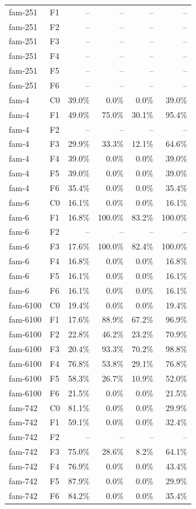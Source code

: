 \begin{tabular}{llrrrr}
fam-251 & F1 & -- & -- & -- & -- \\
fam-251 & F2 & -- & -- & -- & -- \\
fam-251 & F3 & -- & -- & -- & -- \\
fam-251 & F4 & -- & -- & -- & -- \\
fam-251 & F5 & -- & -- & -- & -- \\
fam-251 & F6 & -- & -- & -- & -- \\
fam-4 & C0 & 39.0\% & 0.0\% & 0.0\% & 39.0\% \\
fam-4 & F1 & 49.0\% & 75.0\% & 30.1\% & 95.4\% \\
fam-4 & F2 & -- & -- & -- & -- \\
fam-4 & F3 & 29.9\% & 33.3\% & 12.1\% & 64.6\% \\
fam-4 & F4 & 39.0\% & 0.0\% & 0.0\% & 39.0\% \\
fam-4 & F5 & 39.0\% & 0.0\% & 0.0\% & 39.0\% \\
fam-4 & F6 & 35.4\% & 0.0\% & 0.0\% & 35.4\% \\
fam-6 & C0 & 16.1\% & 0.0\% & 0.0\% & 16.1\% \\
fam-6 & F1 & 16.8\% & 100.0\% & 83.2\% & 100.0\% \\
fam-6 & F2 & -- & -- & -- & -- \\
fam-6 & F3 & 17.6\% & 100.0\% & 82.4\% & 100.0\% \\
fam-6 & F4 & 16.8\% & 0.0\% & 0.0\% & 16.8\% \\
fam-6 & F5 & 16.1\% & 0.0\% & 0.0\% & 16.1\% \\
fam-6 & F6 & 16.1\% & 0.0\% & 0.0\% & 16.1\% \\
fam-6100 & C0 & 19.4\% & 0.0\% & 0.0\% & 19.4\% \\
fam-6100 & F1 & 17.6\% & 88.9\% & 67.2\% & 96.9\% \\
fam-6100 & F2 & 22.8\% & 46.2\% & 23.2\% & 70.9\% \\
fam-6100 & F3 & 20.4\% & 93.3\% & 70.2\% & 98.8\% \\
fam-6100 & F4 & 76.8\% & 53.8\% & 29.1\% & 76.8\% \\
fam-6100 & F5 & 58.3\% & 26.7\% & 10.9\% & 52.0\% \\
fam-6100 & F6 & 21.5\% & 0.0\% & 0.0\% & 21.5\% \\
fam-742 & C0 & 81.1\% & 0.0\% & 0.0\% & 29.9\% \\
fam-742 & F1 & 59.1\% & 0.0\% & 0.0\% & 32.4\% \\
fam-742 & F2 & -- & -- & -- & -- \\
fam-742 & F3 & 75.0\% & 28.6\% & 8.2\% & 64.1\% \\
fam-742 & F4 & 76.9\% & 0.0\% & 0.0\% & 43.4\% \\
fam-742 & F5 & 87.9\% & 0.0\% & 0.0\% & 29.9\% \\
fam-742 & F6 & 84.2\% & 0.0\% & 0.0\% & 35.4\% \\
\bottomrule
\end{tabular}
